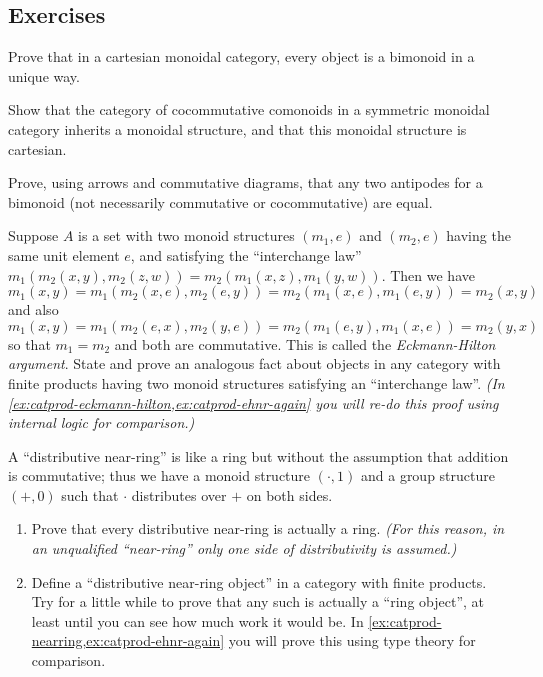 \subsection*{Exercises}

\begin{ex}\label{ex:cartmon-bimon-uniq}
  Prove that in a cartesian monoidal category, every object is a bimonoid in a unique way.
\end{ex}

\begin{ex}\label{ex:ccmon-cart}
  Show that the category of cocommutative comonoids in a symmetric monoidal category inherits a monoidal structure, and that this monoidal structure is cartesian.
\end{ex}

\begin{ex}\label{ex:antipode}
  Prove, using arrows and commutative diagrams, that any two antipodes for a bimonoid (not necessarily commutative or cocommutative) are equal.
\end{ex}

\begin{ex}\label{ex:eckmann-hilton}
  Suppose $A$ is a set with two monoid structures $(m_1,e)$ and $(m_2,e)$ having the same unit element $e$, and satisfying the ``interchange law'' $m_1(m_2(x,y),m_2(z,w)) = m_2(m_1(x,z),m_1(y,w))$.
  Then we have
  \[ m_1(x,y) = m_1(m_2(x,e),m_2(e,y)) = m_2(m_1(x,e),m_1(e,y)) = m_2(x,y) \]
  and also
  \[ m_1(x,y) = m_1(m_2(e,x),m_2(y,e)) = m_2(m_1(e,y),m_1(x,e)) = m_2(y,x) \]
  so that $m_1=m_2$ and both are commutative.
  This is called the \emph{Eckmann-Hilton argument}.
  State and prove an analogous fact about objects in any category with finite products having two monoid structures satisfying an ``interchange law''.
  \textit{(In \cref{ex:catprod-eckmann-hilton,ex:catprod-ehnr-again} you will re-do this proof using internal logic for comparison.)}
\end{ex}

\begin{ex}\label{ex:near-ring}
  A ``distributive near-ring'' is like a ring but without the assumption that addition is commutative; thus we have a monoid structure $(\cdot,1)$ and a group structure $(+,0)$ such that $\cdot$ distributes over $+$ on both sides.
  \begin{enumerate}
  \item Prove that every distributive near-ring is actually a ring.
    \textit{(For this reason, in an unqualified ``near-ring'' only one side of distributivity is assumed.)}
  \item Define a ``distributive near-ring object'' in a category with finite products.
    Try for a little while to prove that any such is actually a ``ring object'', at least until you can see how much work it would be.
    In \cref{ex:catprod-nearring,ex:catprod-ehnr-again} you will prove this using type theory for comparison.
  \end{enumerate}
\end{ex}


